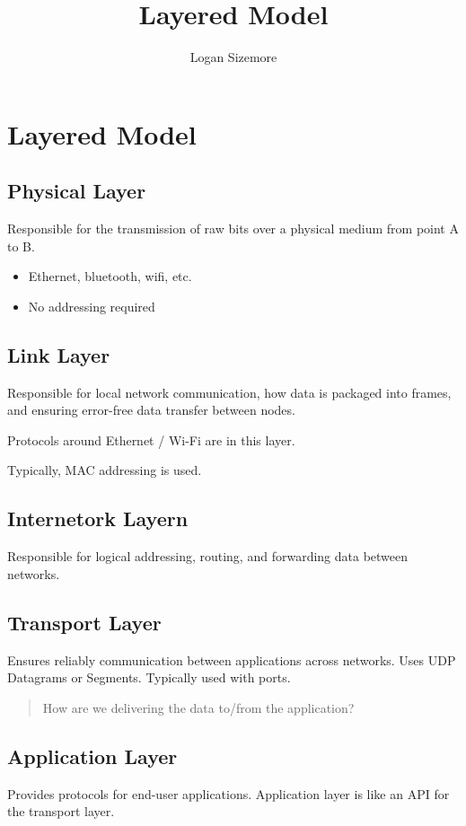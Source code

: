 \documentclass{article}
\title{Layered Model}
\author{Logan Sizemore}
\begin{document}
\maketitle

\section{Layered Model}
\subsection{Physical Layer}
Responsible for the transmission of raw bits over a physical medium from point A
to B.

\begin{itemize}
    \item Ethernet, bluetooth, wifi, etc.
    \item No addressing required
\end{itemize}


\subsection{Link Layer}
Responsible for local network communication, how data is packaged into frames,
and ensuring error-free data transfer between nodes.

Protocols around Ethernet / Wi-Fi are in this layer.

Typically, MAC addressing is used.

\subsection{Internetork Layern}
Responsible for logical addressing, routing, and forwarding data between
networks.

\subsection{Transport Layer}
Ensures reliably communication between applications across networks.
Uses UDP Datagrams or Segments.
Typically used with ports.

\begin{quote}
    How are we delivering the data to/from the application?
\end{quote}

\subsection{Application Layer}
Provides protocols for end-user applications.
Application layer is like an API for the transport layer.
\end{document}
